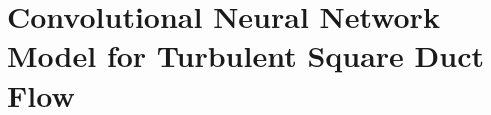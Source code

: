 \documentclass[11pt]{article}
\numberwithin{equation}{section}
\theoremstyle{plain}
\theoremstyle{definition}
\begin{document}



\section{Convolutional Neural Network Model for Turbulent Square Duct Flow}
\label{sec:Convolutional Neural Network Model for Turbulent Duct Flow}
\end{document}
